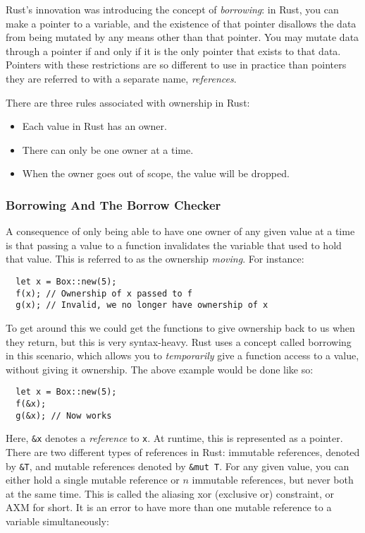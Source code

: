 \documentclass[12pt,twoside]{report}
\begin{document}
Rust's innovation was introducing the concept of \textit{borrowing}: in Rust, you can make a pointer to a variable, and the existence of that pointer disallows the data from being mutated by any means other than that pointer. You may mutate data through a pointer if and only if it is the only pointer that exists to that data. Pointers with these restrictions are so different to use in practice than pointers they are referred to with a separate name, \textit{references}.

There are three rules associated with ownership in Rust:
\begin{itemize}
  \item Each value in Rust has an owner.
  \item There can only be one owner at a time.
  \item When the owner goes out of scope, the value will be dropped.
\end{itemize}

\subsubsection{Borrowing And The Borrow Checker}
A consequence of only being able to have one owner of any given value at a time is that passing a value to a function invalidates the variable that used to hold that value. This is referred to as the ownership \textit{moving}. For instance:

\begin{verbatim}
  let x = Box::new(5);
  f(x); // Ownership of x passed to f
  g(x); // Invalid, we no longer have ownership of x
\end{verbatim}

To get around this we could get the functions to give ownership back to us when they return, but this is very syntax-heavy. Rust uses a concept called borrowing in this scenario, which allows you to \textit{temporarily} give a function access to a value, without giving it ownership. The above example would be done like so:

\begin{verbatim}
  let x = Box::new(5);
  f(&x);
  g(&x); // Now works
\end{verbatim}

Here, \verb|&x| denotes a \textit{reference} to \verb|x|. At runtime, this is represented as a pointer. There are two different types of references in Rust: immutable references, denoted by \verb|&T|, and mutable references denoted by \verb|&mut T|. For any given value, you can either hold a single mutable reference or $n$ immutable references, but never both at the same time. This is called the aliasing xor (exclusive or) constraint, or AXM for short. It is an error to have more than one mutable reference to a variable simultaneously:
\end{document}

